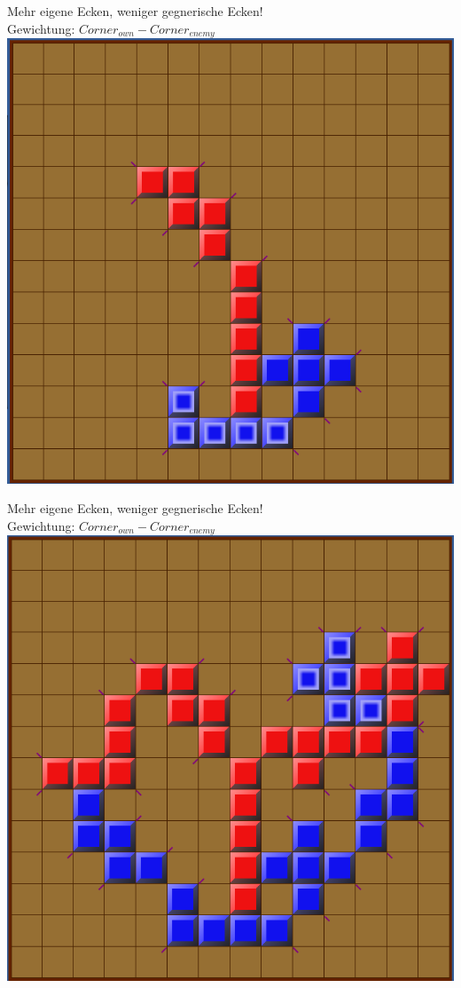 \documentclass[12pt, draft]{beamer}
\begin{document}
\begin{frame}
	Mehr eigene Ecken, weniger gegnerische Ecken!\\
	\pause
	Gewichtung: $Corner_{own} - Corner_{enemy}$\\
	\pause
	\includegraphics[width=0.6\linewidth]{media/wgh4.png}
\end{frame}
\begin{frame}
	Mehr eigene Ecken, weniger gegnerische Ecken!\\
	Gewichtung: $Corner_{own} - Corner_{enemy}$\\
	\includegraphics[width=0.6\linewidth]{media/wgh5.png}
\end{frame}
\end{document}
